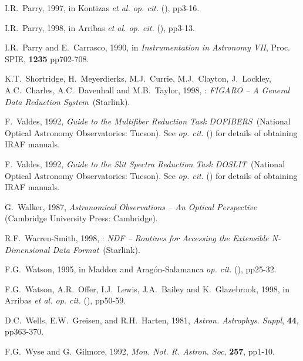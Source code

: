 \documentclass[chapters,twoside,11pt]{starlink}
\begin{document}
\begin{thebibliography}{99}
   I.R.~Parry, 1997, in Kontizas \textit{et al. op. cit.}\/
   (\cite{KONTIZAS97}), pp3-16.

   I.R.~Parry, 1998, in Arribas \textit{et al. op. cit.}\/
   (\cite{ARRIBAS98}), pp3-13.

   I.R.~Parry and E.~Carrasco, 1990, in \textit{Instrumentation in Astronomy VII}, Proc. SPIE, \textbf{1235} pp702-708.

   K.T.~Shortridge, H.~Meyerdierks, M.J.~Currie,
   M.J.~Clayton, J.~Lockley, A.C.~Charles, A.C.~Davenhall and M.B.~Taylor,
   1998, : \textit{FIGARO -- A General Data
   Reduction System}\, (Starlink).

   F.~Valdes, 1992, \textit{Guide to the Multifiber
   Reduction Task DOFIBERS}\, (National Optical Astronomy
   Observatories: Tucson).  See  \textit{op. cit.}\/
   (\cite{SG12}) for details of obtaining IRAF manuals.

   F.~Valdes, 1992, \textit{Guide to the Slit Spectra
   Reduction Task DOSLIT}\, (National Optical Astronomy Observatories:
   Tucson).  See  \textit{op. cit.}\/ (\cite{SG12}) for
   details of obtaining IRAF manuals.

   G.~Walker, 1987, \textit{Astronomical Observations
   -- An Optical Perspective}\, (Cambridge University Press: Cambridge).

   R.F.~Warren-Smith, 1998, :
   \textit{NDF -- Routines for Accessing the Extensible N-Dimensional Data
   Format}\, (Starlink).

   F.G.~Watson, 1995, in Maddox and Arag\'{o}n-Salamanca
   \textit{op. cit.}\/ (\cite{MADDOX95}), pp25-32.

   F.G.~Watson, A.R.~Offer, I.J.~Lewis, J.A.~Bailey
   and K.~Glazebrook, 1998, in Arribas \textit{et al. op. cit.}\/
   (\cite{ARRIBAS98}), pp50-59.

   D.C.~Wells, E.W.~Greisen, and R.H.~Harten, 1981,
   \textit{Astron. Astrophys. Suppl}, \textbf{44}, pp363-370.

   F.G.~Wyse and G.~Gilmore, 1992, \textit{Mon. Not. R.
   Astron. Soc}, \textbf{257}, pp1-10.

\end{thebibliography}

\typeout{  }
\typeout{*****************************************************}
\typeout{  }
\typeout{  }
\typeout{*****************************************************}
\typeout{  }
\end{document}
